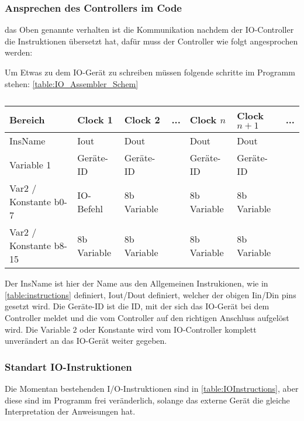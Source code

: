 \documentclass{scrartcl}
\begin{document}
\subsubsection{\label{section:IO-Instructions}Ansprechen des Controllers im Code}
das Oben genannte verhalten ist die Kommunikation nachdem der IO-Controller die Instruktionen übersetzt hat, dafür muss der Controller wie folgt angesprochen werden:

Um Etwas zu dem IO-Gerät zu schreiben müssen folgende schritte im Programm stehen: \autoref{table:IO_Assembler_Schem}

\begin{center}
	\begin{table}[h]
		\caption{\label{table:IO_Assembler_Schem}}
		\begin{tabular}{l | l | l | l | l | l | l}
			 Bereich & Clock 1 & Clock 2 & ... & Clock $n$ & Clock $n+1$ & ... \\
			\hline
			InsName 				& Iout 		  & Dout        &   & Dout        & Dout       \\
			Variable 1 				& Geräte-ID   & Geräte-ID   &   & Geräte-ID   & Geräte-ID  \\
			Var2 / Konstante b0-7 	& IO-Befehl   & 8b Variable &   & 8b Variable & 8b Variable\\
			Var2 / Konstante b8-15 	& 8b Variable & 8b Variable &   & 8b Variable & 8b Variable
 		\end{tabular}
	\end{table}
\end{center}
Der InsName ist hier der Name aus den Allgemeinen Instrukionen, wie in \autoref{table:instructions} definiert, Iout/Dout definiert, welcher der obigen Iin/Din pins gesetzt wird.
Die Geräte-ID ist die ID, mit der sich das IO-Gerät bei dem Controller meldet und die vom Controller auf den richtigen Anschluss aufgelöst wird.
Die Variable $2$ oder Konstante wird vom IO-Controller komplett unverändert an das IO-Gerät weiter gegeben.

\subsubsection{\label{section:IO-Device-Instructions}Standart IO-Instruktionen}

Die Momentan bestehenden I/O-Instruktionen sind in \autoref{table:IOInstructions}, aber diese sind im Programm frei veränderlich, solange das externe Gerät die gleiche Interpretation der Anweisungen hat.
\end{document}
